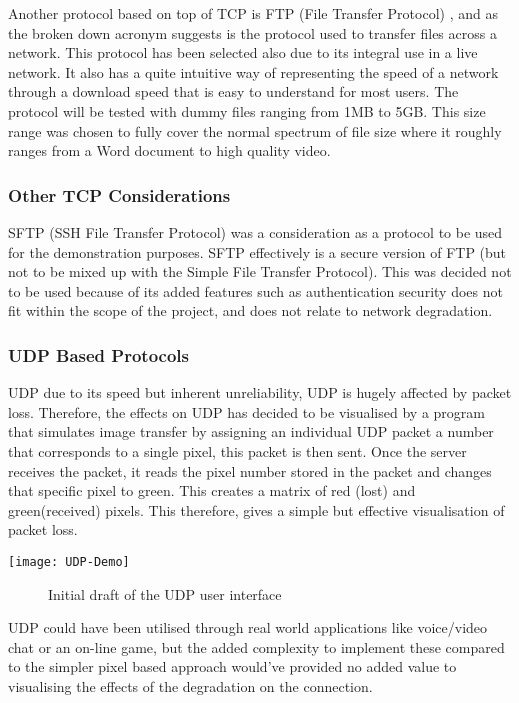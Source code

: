 Another protocol based on top of TCP is FTP (File Transfer Protocol) \citep{FTP}, and as the broken down acronym suggests is the protocol used to transfer files across a network. This protocol has been selected also due to its integral use in a live network. It also has a quite intuitive way of representing the speed of a network through a download speed that is easy to understand for most users. The protocol will be tested with dummy files ranging from 1MB to 5GB. This size range was chosen to fully cover the normal spectrum of file size where it roughly ranges from a Word document to high quality video.

\subsubsection{Other TCP Considerations}
SFTP (SSH File Transfer Protocol) \citep{SFTP} was a consideration as a protocol to be used for the demonstration purposes. SFTP effectively is a secure version of FTP (but not to be mixed up with the Simple File Transfer Protocol). This was decided not to be used because of its added features such as authentication security does not fit within the scope of the project, and does not relate to network degradation. 



\subsubsection{UDP Based Protocols}
UDP due to its speed but inherent unreliability, UDP is hugely affected by packet loss. Therefore, the effects on UDP has decided to be visualised by a program that simulates image transfer by assigning an individual UDP packet a number that corresponds to a single pixel, this packet is then sent. Once the server receives the packet, it reads the pixel number stored in the packet and changes that specific pixel to green. This creates a matrix of red (lost) and green(received) pixels. This therefore, gives a simple but effective visualisation of packet loss. 

\begin{center}
\texttt{[image: UDP-Demo]}
	\begin{figure}[h]
		\caption{Initial draft of the UDP user interface}
	\end{figure}
\end{center}

UDP could have been utilised through real world applications like voice/video chat or an on-line game, but the added complexity to implement these compared to the simpler pixel based approach would've provided no added value to visualising the effects of the degradation on the connection.

